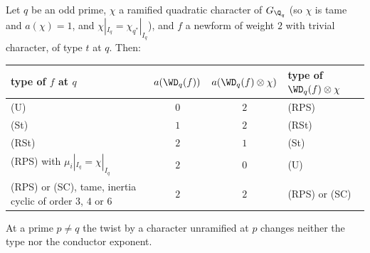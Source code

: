 \begin{proposition}\label{prop:modgalrep:twist-conductor}
Let $q$ be an odd prime, $\chi$ a ramified quadratic character of $G_{\Q_q}$ (so $\chi$ is tame and $a(\chi)=1$, and $\chi|_{I_q}=\chi_{q^*}|_{I_q}$), and $f$ a newform of
weight $2$ with trivial character, of type $t$ at $q$. Then:
\begin{center}\small
\begin{tabular}{@{}p{5.2cm}ccl@{}}
\toprule
type of $f$ at $q$ & $a(\WD_q(f))$ & $a(\WD_q(f)\otimes\chi)$ & type of $\WD_q(f)\otimes\chi$\\
\midrule
(U) & $0$ & $2$ & (RPS)\\
(St) & $1$ & $2$ & (RSt)\\
(RSt) & $2$ & $1$ & (St)\\
(RPS) with $\mu_i|_{I_q}=\chi|_{I_q}$ & $2$ & $0$ & (U)\\
(RPS) or (SC), tame, inertia cyclic of order $3$, $4$ or $6$ & $2$ & $2$ & (RPS) or (SC)\\
\bottomrule
\end{tabular}
\end{center}
At a prime $p\ne q$ the twist by a character unramified at $p$ changes neither the type nor the conductor exponent.
\end{proposition}

